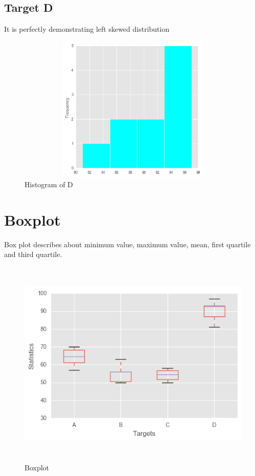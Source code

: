 \documentclass[11pt]{report}
\begin{document}
\subsection{Target D}
It is perfectly demonstrating left skewed distribution
\begin{center}
\begin{figure}[h!]
  \centering
  \includegraphics[height = 7cm, width = 14cm]{D_hist.png}
  \caption{Histogram of D}
  \label{fig:hist_d}
\end{figure} 
\end{center}

\section{Boxplot}
Box plot describes about minimum value, maximum value, mean, first quartile and third quartile.

\begin{figure}[!h]
  \centering
  \includegraphics[height = 10cm, width = 14cm]{boxplot.png}
  \caption{Boxplot}
  \label{fig:boxplot}
\end{figure}
\end{document}
